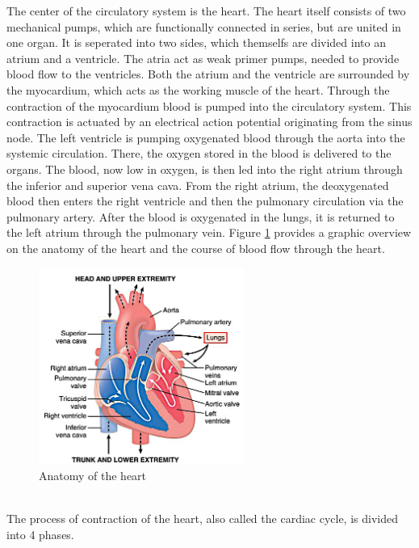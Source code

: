 The center of the circulatory system is the heart. The heart itself consists of two mechanical pumps, which are functionally connected in series, but are united in one organ. It is seperated into two sides, which themselfs are divided into an atrium and a ventricle. The atria act as weak primer pumps, needed to provide blood flow to the ventricles.\cite{HKS4} Both the atrium and the ventricle are surrounded by the myocardium, which acts as the working muscle of the heart. Through the contraction of the myocardium blood is pumped into the circulatory system.\cite{HKS7} This contraction is actuated by an electrical action potential originating from the sinus node. The left ventricle is pumping oxygenated blood through the aorta into the systemic circulation. There, the oxygen stored in the blood is delivered to the organs. The blood, now low in oxygen, is then led into the right atrium through the inferior and superior vena cava. From the right atrium, the deoxygenated blood then enters the right ventricle and then the pulmonary circulation via the pulmonary artery. After the blood is oxygenated in the lungs, it is returned to the left atrium through the pulmonary vein.\cite{HKS4} Figure \ref{fig:heart_anat} provides a graphic overview on the anatomy of the heart and the course of blood flow through the heart.
\begin{figure}[h]
  \centering
  \includegraphics[width=0.6\textwidth]{images/heart_1.jpg}
  \caption{Anatomy of the heart \cite{GH20}}
  \label{fig:heart_anat}
\end{figure}
\\The process of contraction of the heart, also called the cardiac cycle, is divided into 4 phases.


